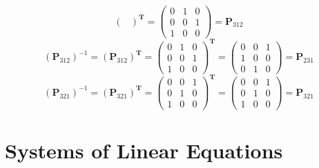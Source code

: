 \documentclass[oneside]{book}
\begin{document}
{{\[\begin{pmatrix}
                \end{pmatrix}^{\mathbf{T}}
                =
                \begin{pmatrix}
                    0 & 1 & 0\\
                    0 & 0 & 1\\
                    1 & 0 & 0
                \end{pmatrix}
                =
                \mathbf{P}_{312}
        \]
        \[
            (\mathbf{P}_{312})^{-1}=
                (\mathbf{P}_{312})^{\mathbf{T}}
                =
                \begin{pmatrix}
                    0 & 1 & 0\\
                    0 & 0 & 1\\
                    1 & 0 & 0
                \end{pmatrix}^{\mathbf{T}}
                =
                \begin{pmatrix}
                    0 & 0 & 1\\
                    1 & 0 & 0\\
                    0 & 1 & 0
                \end{pmatrix}
                =
                \mathbf{P}_{231}
        \]
        \[
            (\mathbf{P}_{321})^{-1}=
                (\mathbf{P}_{321})^{\mathbf{T}}
                =
                \begin{pmatrix}
                    0 & 0 & 1\\
                    0 & 1 & 0\\
                    1 & 0 & 0
                \end{pmatrix}^{\mathbf{T}}
                =
                \begin{pmatrix}
                    0 & 0 & 1\\
                    0 & 1 & 0\\
                    1 & 0 & 0
                \end{pmatrix}
                =
                \mathbf{P}_{321}
        \]
    }
}

\chapter{Systems of Linear Equations}
\end{document}
